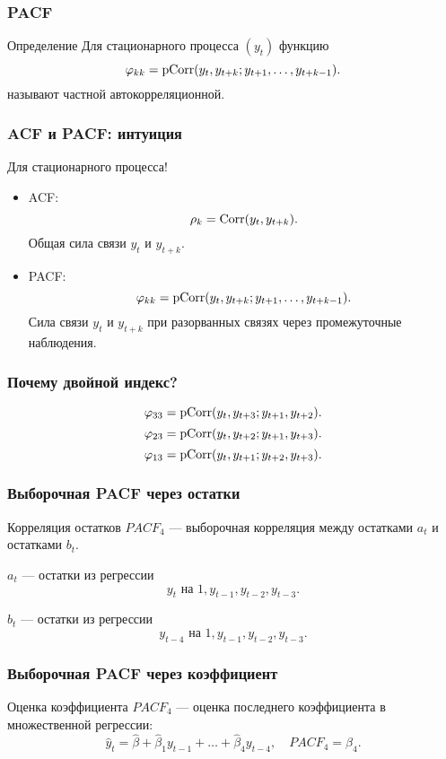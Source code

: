 \begin{frame}
  \frametitle{PACF}

  \begin{block}{Определение}
    Для стационарного процесса $(y_t)$ функцию 
    \[
      \varphi_{kk} = \operatorname{pCorr}(y_t, y_{t+k}; y_{t+1}, \ldots, y_{t+k-1}).
    \] 
    называют \alert{частной автокорреляционной}. 
  \end{block}
\end{frame}

\begin{frame}
  \frametitle{ACF и PACF: интуиция}

  Для \alert{стационарного процесса}!

  \begin{itemize}
    \item ACF:
    \[
      \rho_k = \operatorname{Corr}(y_t, y_{t+k}).
    \]
    \alert{Общая сила} связи $y_t$ и $y_{t+k}$.
    \item PACF:
    \[
      \varphi_{kk} = \operatorname{pCorr}(y_t, y_{t+k}; y_{t+1}, \ldots, y_{t+k-1}).
    \]
    \alert{Сила} связи $y_t$ и $y_{t+k}$ при \alert{разорванных} связях через промежуточные наблюдения.
  \end{itemize}
\end{frame}

\begin{frame}
  \frametitle{Почему двойной индекс?}

  \[
  \varphi_{33} = \operatorname{pCorr}(y_t, y_{t+3}; y_{t+1}, y_{t+2}).  
  \]
  \pause
  \[
  \varphi_{23} = \operatorname{pCorr}(y_t, y_{t+2}; y_{t+1}, y_{t+3}).  
  \]
  \pause
  \[
  \varphi_{13} = \operatorname{pCorr}(y_t, y_{t+1}; y_{t+2}, y_{t+3}).  
  \]
\end{frame}

\begin{frame}
  \frametitle{Выборочная PACF через остатки}

  \begin{block}{Корреляция остатков}
    $PACF_4$ — выборочная корреляция \alert{между остатками} $a_t$ и остатками $b_t$.

    $a_t$ — остатки из регрессии
    \[
      y_t \text{ на } 1, y_{t-1}, y_{t-2}, y_{t-3}.
    \]

    $b_t$ — остатки из регрессии
    \[
      y_{t-4} \text{ на } 1, y_{t-1}, y_{t-2}, y_{t-3}.
    \]
  \end{block}
\end{frame}


\begin{frame}
  \frametitle{Выборочная PACF через коэффициент}

  \begin{block}{Оценка коэффициента}
    $PACF_4$ — оценка \alert{последнего коэффициента} в множественной регрессии:
      \[
        \hat y_t = \hat\beta + \hat\beta_1 y_{t-1} + \ldots + \hat\beta_4 y_{t-4}, \quad PACF_4 = \hat\beta_4.
      \]
  \end{block}

\end{frame}

